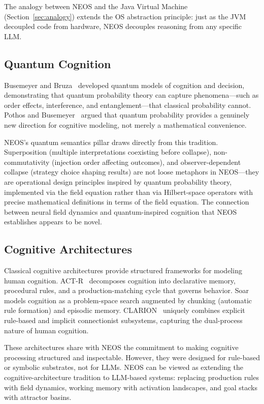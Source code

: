 The analogy between NEOS and the Java Virtual Machine (Section~\ref{sec:analogy}) extends the OS abstraction principle: just as the JVM decoupled code from hardware, NEOS decouples reasoning from any specific LLM.

\subsection{Quantum Cognition}

Busemeyer and Bruza~\cite{busemeyer2012quantum} developed quantum models of cognition and decision, demonstrating that quantum probability theory can capture phenomena---such as order effects, interference, and entanglement---that classical probability cannot. Pothos and Busemeyer~\cite{pothos2013can} argued that quantum probability provides a genuinely new direction for cognitive modeling, not merely a mathematical convenience.

NEOS's quantum semantics pillar draws directly from this tradition. Superposition (multiple interpretations coexisting before collapse), non-commutativity (injection order affecting outcomes), and observer-dependent collapse (strategy choice shaping results) are not loose metaphors in NEOS---they are operational design principles inspired by quantum probability theory, implemented via the field equation rather than via Hilbert-space operators with precise mathematical definitions in terms of the field equation. The connection between neural field dynamics and quantum-inspired cognition that NEOS establishes appears to be novel.

\subsection{Cognitive Architectures}

Classical cognitive architectures provide structured frameworks for
modeling human cognition.  ACT-R~\cite{anderson2007how} decomposes
cognition into declarative memory, procedural rules, and a
production-matching cycle that governs behavior.
Soar~\cite{laird2012soar} models cognition as a problem-space search
augmented by chunking (automatic rule formation) and episodic memory.
CLARION~\cite{sun2006clarion} uniquely combines explicit rule-based
and implicit connectionist subsystems, capturing the dual-process
nature of human cognition.

These architectures share with NEOS the commitment to making cognitive
processing structured and inspectable.  However, they were designed for
rule-based or symbolic substrates, not for LLMs.  NEOS can be viewed as
extending the cognitive-architecture tradition to LLM-based systems:
replacing production rules with field dynamics, working memory with
activation landscapes, and goal stacks with attractor basins.

